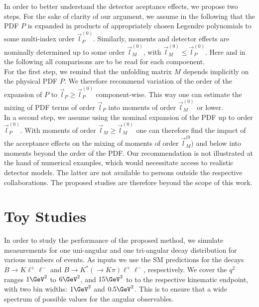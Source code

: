 \documentclass[aps,prd,reprint,nofootinbib,preprintnumbers]{revtex4}
\newcommand{\danny}[1]{{\color{purple}#1}}
\begin{document}
\danny{In order to better understand the detector aceptance effects, we propose two steps. For the sake of
    clarity of our argument, we assume in the following that the PDF $P$ is expanded in products of
    appropriately chosen Legendre polynomials to some multi-index order $\vec{l}_P^{(0)}$. Similarly,
    moments and detector effects are nominally determined up to some order $\vec{l}_M^{(0)}$, with
    $\vec{l}_M^{(0)} \leq \vec{l}_P^{(0)}$. Here and in the following all comparisons are to be read
    for each compoenent.\\
    For the first step, we remind that the unfolding matrix $M$ depends implicitly on the physical
    PDF $P$. We therefore recommend variation of the order of the expansion of $P$ to $\vec{l}_P \geq \vec{l}_P^{(0)}$
    component-wise. This way one can estimate the mixing of PDF terms of order $\vec{l}_P$ into moments of order $\vec{l}_M^{(0)}$
    or lower.\\
    In a second step, we assume using the nominal expansion of the PDF up to order $\vec{l}_P^{(0)}$.
    With moments of order $\vec{l}_M \geq \vec{l}_M^{(0)}$ one can therefore find the impact of the
    acceptance effects on the mixing of moments of order $\vec{l}_M^{(0})$ and below
    into moments beyond the order of the PDF.
    Our recommendation is not illustrated at the hand of numerical examples, which would necessitate
    access to realistic detector models. The latter are not available to persons outside the
    respective collaborations. The proposed studies are therefore beyond the scope of this work.
}



\section{Toy Studies}
\label{sec:numerics}

In order to study the performance of the proposed method, we simulate measurements for one uni-angular
and one tri-angular decay distribution for various numbers of events. As inputs we use the SM predictions
for the decays $B\to K\ell^+\ell^-$ and $B\to K^*(\to K\pi)\ell^+\ell^-$, respectively. We cover the
$q^2$ ranges $1\GeV^2$ to $6\GeV^2$, and $15\GeV^2$ to to the respective kinematic endpoint, with two
bin widths: $1\GeV^2$ and $0.5\GeV^2$. This is to ensure that a wide spectrum of possible values for
the angular observables.\\
\end{document}
